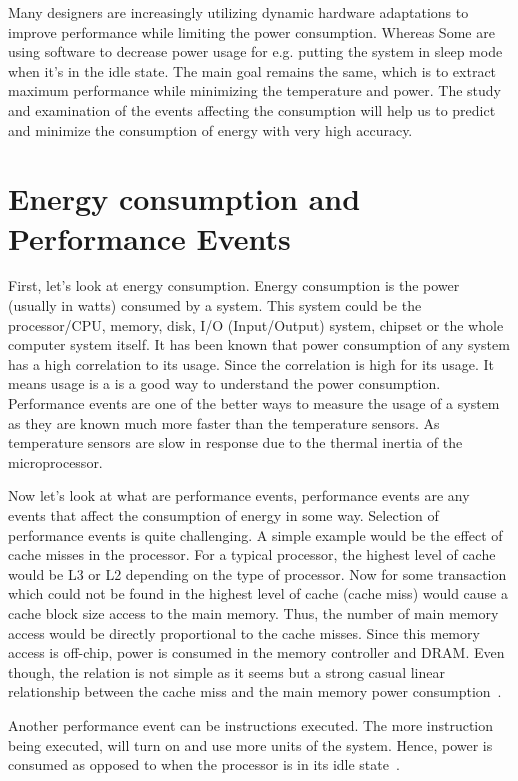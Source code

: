 Many designers are increasingly utilizing dynamic hardware adaptations to improve performance while limiting the power consumption. Whereas Some are using software to decrease power usage for e.g. putting the system in sleep mode when it's in the idle state. The main goal remains the same, which is to extract maximum performance while minimizing the temperature and power. The study and examination of the events affecting the consumption will help us to predict and minimize the consumption of energy with very high accuracy.

\section{Energy consumption and Performance Events}

First, let's look at energy consumption. Energy consumption is the power (usually in watts) consumed by a system. This system could be the processor/CPU, memory, disk, I/O (Input/Output) system, chipset or the whole computer system itself. It has been known that power consumption of any system has a high correlation to its usage. Since the correlation is high for its usage. It means usage is a is a good way to understand the power consumption. Performance events are one of the better ways to measure the usage of a system as they are known much more faster than the temperature sensors. As temperature sensors are slow in response due to the thermal inertia of the microprocessor.

Now let's look at what are performance events, performance events are any events that affect the consumption of energy in some way. Selection of performance events is quite challenging. A simple example would be the effect of cache misses in the processor. For a typical processor, the highest level of cache would be L3 or L2 depending on the type of processor. Now for some transaction which could not be found in the highest level of cache (cache miss) would cause a cache block size access to the main memory. Thus, the number of main memory access would be directly proportional to the cache misses. Since this memory access is off-chip, power is consumed in the memory controller and DRAM. Even though, the relation is not simple as it seems but a strong casual linear relationship between the cache miss and the main memory power consumption~\cite{bircher2007complete}.

Another performance event can be instructions executed. The more instruction being executed, will turn on and use more units of the system. Hence, power is consumed as opposed to when the processor is in its idle state~\cite{gilberto2005power}.

